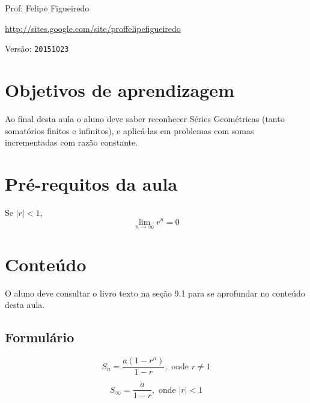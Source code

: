 \documentclass[a4paper]{article}
\begin{document}
\parbox[c]{.825\textwidth}{\raggedright%
{Prof: Felipe Figueiredo\par}
{\url{http://sites.google.com/site/proffelipefigueiredo}\par}
}

Versão: \verb|20151023|



\section{Objetivos de aprendizagem}

Ao final desta aula o aluno deve saber reconhecer Séries Geométricas
(tanto somatórios finitos e infinitos), e aplicá-las em problemas com
somas incrementadas com razão constante.


\section{Pré-requitos da aula}

Se $|r|<1$,
\begin{displaymath}
  \lim_{n \rightarrow \infty} r^n = 0
\end{displaymath}

\section{Conteúdo}

O aluno deve consultar o livro texto na seção 9.1 para se aprofundar
no conteúdo desta aula.

\subsection{Formulário}
\label{sec:formulario}

\begin{displaymath}
  S_n = \frac{a(1-r^n)}{1-r}, \textrm{ onde } r \ne 1
\end{displaymath}

\begin{displaymath}
  S_\infty = \frac{a}{1-r}, \textrm{ onde } |r| < 1
\end{displaymath}
\end{document}
